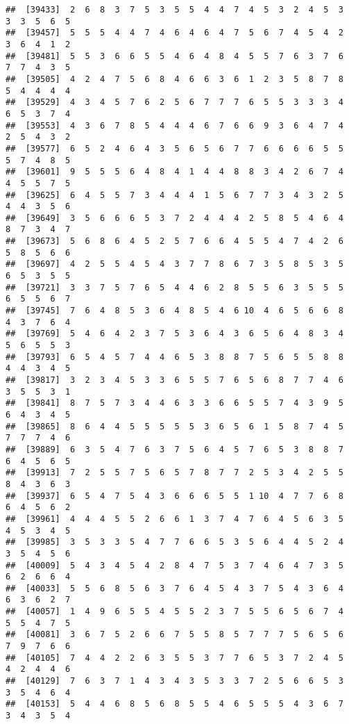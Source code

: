 \documentclass[
]{book}
\begin{document}
\begin{verbatim}
##  [39433]  2  6  8  3  7  5  3  5  5  4  4  7  4  5  3  2  4  5  3  3  3  5  6  5
##  [39457]  5  5  5  4  4  7  4  6  4  6  4  7  5  6  7  4  5  4  2  3  6  4  1  2
##  [39481]  5  5  3  6  6  5  5  4  6  4  8  4  5  5  7  6  3  7  6  7  7  4  3  5
##  [39505]  4  2  4  7  5  6  8  4  6  6  3  6  1  2  3  5  8  7  8  5  4  4  4  4
##  [39529]  4  3  4  5  7  6  2  5  6  7  7  7  6  5  5  3  3  3  4  6  5  3  7  4
##  [39553]  4  3  6  7  8  5  4  4  4  6  7  6  6  9  3  6  4  7  4  2  5  4  3  2
##  [39577]  6  5  2  4  6  4  3  5  6  5  6  7  7  6  6  6  6  5  5  5  7  4  8  5
##  [39601]  9  5  5  5  6  4  8  4  1  4  4  8  8  3  4  2  6  7  4  4  5  5  7  5
##  [39625]  6  4  5  5  7  3  4  4  4  1  5  6  7  7  3  4  3  2  5  4  4  3  5  6
##  [39649]  3  5  6  6  6  5  3  7  2  4  4  4  2  5  8  5  4  6  4  8  7  3  4  7
##  [39673]  5  6  8  6  4  5  2  5  7  6  6  4  5  5  4  7  4  2  6  5  8  5  6  6
##  [39697]  4  2  5  5  4  5  4  3  7  7  8  6  7  3  5  8  5  3  5  6  5  3  5  5
##  [39721]  3  3  7  5  7  6  5  4  4  6  2  8  5  5  6  3  5  5  5  6  5  5  6  7
##  [39745]  7  6  4  8  5  3  6  4  8  5  4  6 10  4  6  5  6  6  8  4  3  7  6  4
##  [39769]  5  4  6  4  2  3  7  5  3  6  4  3  6  5  6  4  8  3  4  5  6  5  5  3
##  [39793]  6  5  4  5  7  4  4  6  5  3  8  8  7  5  6  5  5  8  8  4  4  3  4  5
##  [39817]  3  2  3  4  5  3  3  6  5  5  7  6  5  6  8  7  7  4  6  3  5  5  3  1
##  [39841]  8  7  5  7  3  4  4  6  3  3  6  6  5  5  7  4  3  9  5  6  4  3  4  5
##  [39865]  8  6  4  4  5  5  5  5  5  3  6  5  6  1  5  8  7  4  5  7  7  7  4  6
##  [39889]  6  3  5  4  7  6  3  7  5  6  4  5  7  6  5  3  8  8  7  6  4  5  6  5
##  [39913]  7  2  5  5  7  5  6  5  7  8  7  7  2  5  3  4  2  5  5  8  4  3  6  3
##  [39937]  6  5  4  7  5  4  3  6  6  6  5  5  1 10  4  7  7  6  8  6  4  5  6  2
##  [39961]  4  4  4  5  5  2  6  6  1  3  7  4  7  6  4  5  6  3  5  4  5  3  4  5
##  [39985]  3  5  3  3  5  4  7  7  6  6  5  3  5  6  4  4  5  2  4  3  5  4  5  6
##  [40009]  5  4  3  4  5  4  2  8  4  7  5  3  7  4  6  4  7  3  5  6  2  6  6  4
##  [40033]  5  5  6  8  5  6  3  7  6  4  5  4  3  7  5  4  3  6  4  6  3  6  2  7
##  [40057]  1  4  9  6  5  5  4  5  5  2  3  7  5  5  6  5  6  7  4  5  5  4  7  5
##  [40081]  3  6  7  5  2  6  6  7  5  5  8  5  7  7  7  5  6  5  6  7  9  7  6  6
##  [40105]  7  4  4  2  2  6  3  5  5  3  7  7  6  5  3  7  2  4  5  4  2  4  4  6
##  [40129]  7  6  3  7  1  4  3  4  3  5  3  3  7  2  5  6  6  5  3  3  5  4  6  4
##  [40153]  5  4  4  6  8  5  6  8  5  5  4  6  5  5  5  4  3  6  7  3  4  3  5  4

\end{verbatim}
\end{document}
